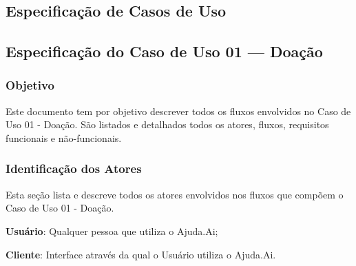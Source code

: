 \begin{anexosenv}



\chapter{Especificação de Casos de Uso} \label{anexo:b}

\section*{Especificação do Caso de Uso 01 --- Doação}
\subsection*{Objetivo}
Este documento tem por objetivo descrever todos os fluxos envolvidos no Caso de Uso 01 - Doação. São listados e detalhados todos os atores, fluxos, requisitos funcionais e não-funcionais.

\subsection*{Identificação dos Atores}
Esta seção lista e descreve todos os atores envolvidos nos fluxos que compõem o Caso de Uso 01 - Doação.
\begin{lista}
  \item \textbf{Usuário}: Qualquer pessoa que utiliza o Ajuda.Ai;
  \item \textbf{Cliente}: Interface através da qual o Usuário utiliza o Ajuda.Ai.
\end{lista}


\end{anexosenv}

